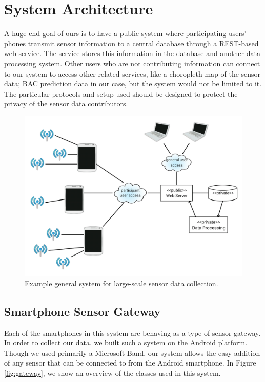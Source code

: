 \section{System Architecture}

A huge end-goal of ours is to have a public system where participating users' phones transmit sensor information to a central database through a REST-based web service. The service stores this information in the database and another data processing system. Other users who are not contributing information can connect to our system to access other related services, like a choropleth map of the sensor data; BAC prediction data in our case, but the system would not be limited to it. The particular protocols and setup used should be designed to protect the privacy of the sensor data contributors.

\begin{figure}
	\includegraphics[width=1.0\textwidth]{../figs/system}
	\caption{Example general system for large-scale sensor data collection.}
	\label{fig:system}
\end{figure}

\subsection{Smartphone Sensor Gateway}

Each of the smartphones in this system are behaving as a type of sensor gateway. In order to collect our data, we built such a system on the Android platform. Though we used primarily a Microsoft Band, our system allows the easy addition of any sensor that can be connected to from the Android smartphone. In Figure \ref{fig:gateway}, we show an overview of the classes used in this system.

